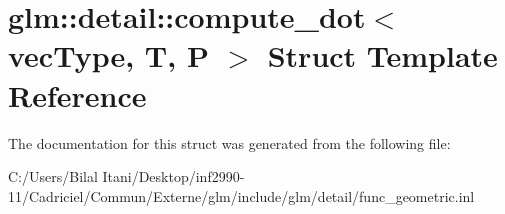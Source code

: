 \hypertarget{structglm_1_1detail_1_1compute__dot}{}\section{glm\+:\+:detail\+:\+:compute\+\_\+dot$<$ vec\+Type, T, P $>$ Struct Template Reference}
\label{structglm_1_1detail_1_1compute__dot}


The documentation for this struct was generated from the following file\+:\begin{DoxyCompactItemize}
\item 
C\+:/\+Users/\+Bilal Itani/\+Desktop/inf2990-\/11/\+Cadriciel/\+Commun/\+Externe/glm/include/glm/detail/func\+\_\+geometric.\+inl\end{DoxyCompactItemize}
